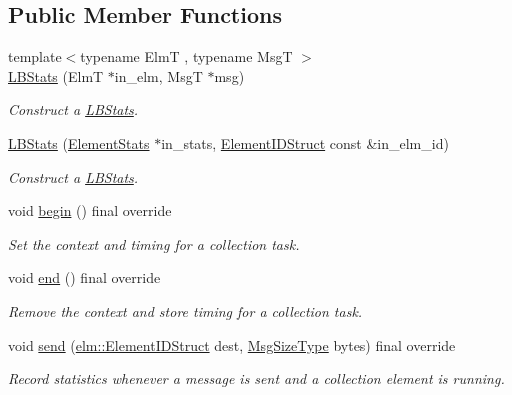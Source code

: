 \subsection*{Public Member Functions}
\begin{DoxyCompactItemize}
\item 
{\footnotesize template$<$typename ElmT , typename MsgT $>$ }\\\hyperlink{structvt_1_1ctx_1_1_l_b_stats_aa1212c9a206b738a146981acbc48327d}{L\+B\+Stats} (ElmT $\ast$in\+\_\+elm, MsgT $\ast$msg)
\begin{DoxyCompactList}\small\item\em Construct a {\ttfamily \hyperlink{structvt_1_1ctx_1_1_l_b_stats}{L\+B\+Stats}}. \end{DoxyCompactList}\item 
\hyperlink{structvt_1_1ctx_1_1_l_b_stats_a4101dc44fea8620e91c908c136e44954}{L\+B\+Stats} (\hyperlink{structvt_1_1ctx_1_1_l_b_stats_ae1eb05f8cd4ad63a08ff3cf87ef34e1d}{Element\+Stats} $\ast$in\+\_\+stats, \hyperlink{structvt_1_1ctx_1_1_l_b_stats_a2ba0297a3c99e495b74b73abbf888bde}{Element\+I\+D\+Struct} const \&in\+\_\+elm\+\_\+id)
\begin{DoxyCompactList}\small\item\em Construct a {\ttfamily \hyperlink{structvt_1_1ctx_1_1_l_b_stats}{L\+B\+Stats}}. \end{DoxyCompactList}\item 
void \hyperlink{structvt_1_1ctx_1_1_l_b_stats_a209aad8645b7e7a4328b71c29f935da4}{begin} () final override
\begin{DoxyCompactList}\small\item\em Set the context and timing for a collection task. \end{DoxyCompactList}\item 
void \hyperlink{structvt_1_1ctx_1_1_l_b_stats_a55efc4d1d6eb579943b5b39d2a823328}{end} () final override
\begin{DoxyCompactList}\small\item\em Remove the context and store timing for a collection task. \end{DoxyCompactList}\item 
void \hyperlink{structvt_1_1ctx_1_1_l_b_stats_a59e0a2ee48beaf5a86f1a29b69b87f88}{send} (\hyperlink{structvt_1_1elm_1_1_element_i_d_struct}{elm\+::\+Element\+I\+D\+Struct} dest, \hyperlink{namespacevt_a408e86a8c7c89309b52907dc5a513924}{Msg\+Size\+Type} bytes) final override
\begin{DoxyCompactList}\small\item\em Record statistics whenever a message is sent and a collection element is running. \end{DoxyCompactList}\item 

\end{DoxyCompactItemize}
